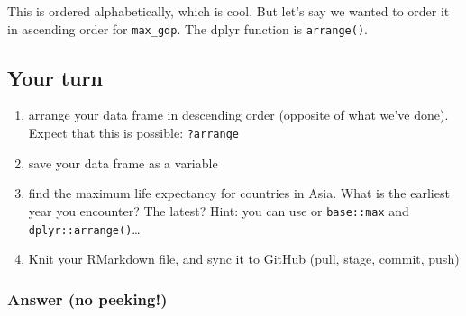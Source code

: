 \documentclass[]{book}
\newenvironment{Shaded}{\begin{snugshade}}{\end{snugshade}}
\newcommand{\KeywordTok}[1]{\textcolor[rgb]{0.13,0.29,0.53}{\textbf{#1}}}
\newcommand{\DataTypeTok}[1]{\textcolor[rgb]{0.13,0.29,0.53}{#1}}
\newcommand{\StringTok}[1]{\textcolor[rgb]{0.31,0.60,0.02}{#1}}
\newcommand{\OperatorTok}[1]{\textcolor[rgb]{0.81,0.36,0.00}{\textbf{#1}}}
\newcommand{\NormalTok}[1]{#1}
\providecommand{\tightlist}{%
  \setlength{\itemsep}{0pt}\setlength{\parskip}{0pt}}
\theoremstyle{definition}
\theoremstyle{definition}
\theoremstyle{definition}
\theoremstyle{remark}
\begin{document}
This is ordered alphabetically, which is cool. But let's say we wanted
to order it in ascending order for \texttt{max\_gdp}. The dplyr function
is \texttt{arrange()}.

\begin{Shaded}
\end{Shaded}

\subsection{Your turn}\label{your-turn-9}

\begin{enumerate}
\def\labelenumi{\arabic{enumi}.}
\tightlist
\item
  arrange your data frame in descending order (opposite of what we've
  done). Expect that this is possible: \texttt{?arrange}
\item
  save your data frame as a variable
\item
  find the maximum life expectancy for countries in Asia. What is the
  earliest year you encounter? The latest? Hint: you can use or
  \texttt{base::max} and \texttt{dplyr::arrange()}\ldots{}
\item
  Knit your RMarkdown file, and sync it to GitHub (pull, stage, commit,
  push)
\end{enumerate}

\subsubsection{Answer (no peeking!)}\label{answer-no-peeking}

\begin{Shaded}
\end{Shaded}
\end{document}
